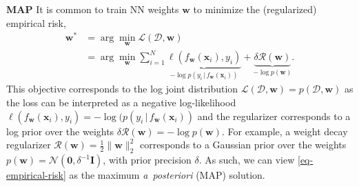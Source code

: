 \documentclass{article}
\newcommand{\dataset}{\ensuremath{\mathcal{D}}}
\newcommand{\inputDomain}{\ensuremath{\mathbb{R}^{D}}}
\newcommand{\outputDomain}{\ensuremath{\mathbb{R}^{C}}}
\newcommand{\weights}{\ensuremath{\mathbf{w}}}
\newcommand{\mbf}[1]{\mathbf{#1}}
\renewcommand{\mid}{\,|\,}
\newcommand{\MI}{\mbf{I}}
\newcommand{\vzeros}{\mbf{0}}
\newcommand{\vx}{\mbf{x}}
\newcommand{\vy}{\mbf{y}}
\newcommand{\vw}{\mbf{w}}
\newcommand{\Norm}{\mathcal{N}}
\begin{document}


\textbf{MAP}
It is common to train NN weights $\vw$ to minimize the (regularized) empirical risk,
%
\begin{align} \label{eq-empirical-risk}
  \weights^{*} &=
                 \arg \min_{\weights} \mathcal{L}(\dataset,\weights) \nonumber \\
               &=
  \arg \min_{\weights} \textstyle\sum_{i=1}^{N} \underbrace{\ell(f_\weights(\mathbf{x}_{i}), y_i)}_{-\log p(y_{i} \mid f_{\vw}(\vx_{i}))} + \underbrace{\delta \mathcal{R}(\weights)}_{-\log p(\vw)}.
\end{align}
%
This objective corresponds to the log joint distribution $\mathcal{L}(\mathcal{D},\vw)=p(\mathcal{D}, \vw)$
as the loss can be interpreted as a negative log-likelihood $\ell(f_\weights(\vx_{i}), y_i) = -\log(p(y_{i} \mid f_\weights(\vx_{i}))$
and the regularizer corresponds to a log prior over the weights $\delta\mathcal{R}(\weights) = -\log p(\vw)$.
For example, a weight decay regularizer $\mathcal{R}(\vw) = \frac{1}{2}\|\weights\|^{2}_2$ corresponds to a Gaussian prior over the weights $p(\vw) = \Norm(\vzeros, \delta^{-1} \MI)$, with
prior precision $\delta$.
As such, we can view \cref{eq-empirical-risk} as the maximum {\it a~posteriori} (MAP) solution.

\end{document}
